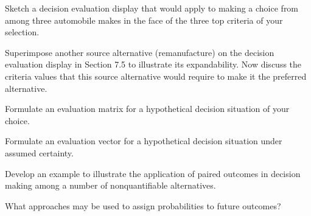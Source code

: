 \begin{exercises}
    \begin{exercise}
    \label{sea-07-23}
        Sketch a decision evaluation display that would apply to making a choice from among three automobile makes in the face of the three top criteria of your selection.
    \end{exercise}
    \begin{solution}
    \end{solution}
    
    \begin{exercise}
    \label{sea-07-24}
        Superimpose another source alternative (remanufacture) on the decision evaluation display in Section 7.5 to illustrate its expandability. Now discuss the criteria values that this source alternative would require to make it the preferred alternative.
    \end{exercise}
    \begin{solution}
    \end{solution}
    
    \begin{exercise}
    \label{sea-07-25}
        Formulate an evaluation matrix for a hypothetical decision situation of your choice.
    \end{exercise}
    \begin{solution}
    \end{solution}
    
    \begin{exercise}
    \label{sea-07-26}
        Formulate an evaluation vector for a hypothetical decision situation under assumed certainty.
    \end{exercise}
    \begin{solution}
    \end{solution}
    
    \begin{exercise}
    \label{sea-07-27}
        Develop an example to illustrate the application of paired outcomes in decision making among a number of nonquantifiable alternatives.
    \end{exercise}
    \begin{solution}
    \end{solution}
    
    \begin{exercise}
    \label{sea-07-28}
        What approaches may be used to assign probabilities to future outcomes?
    \end{exercise}
    \begin{solution}
    \end{solution}
    

\end{exercises}
